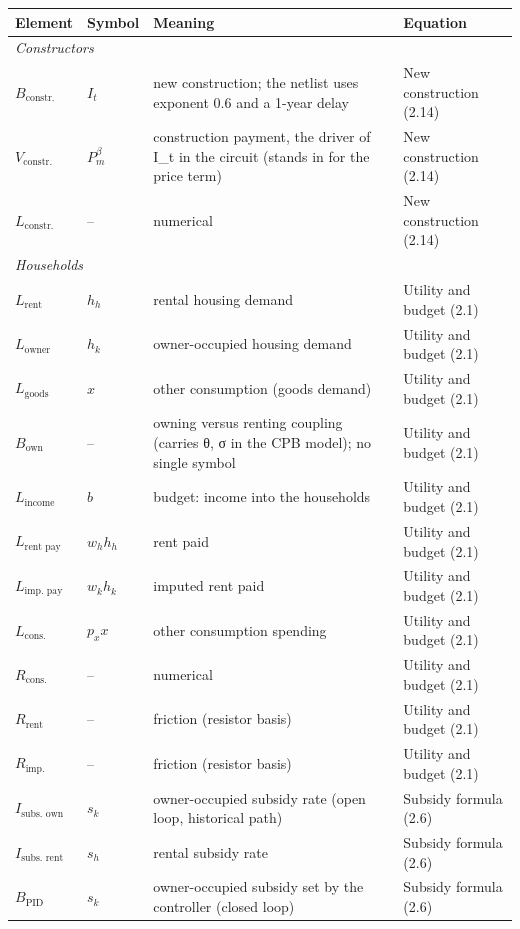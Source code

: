 \begin{tabular}{llll}
\toprule
Element & Symbol & Meaning & Equation\\
\midrule
\multicolumn{4}{l}{\textit{Constructors}}\\
$B_{\text{constr.}}$ & $I_t$ & new construction; the netlist uses exponent 0.6 and a 1-year delay & New construction (2.14)\\
$V_{\text{constr.}}$ & $P_m^{\beta}$ & construction payment, the driver of I\_t in the circuit (stands in for the price term) & New construction (2.14)\\
$L_{\text{constr.}}$ & -- & numerical & New construction (2.14)\\
\midrule
\multicolumn{4}{l}{\textit{Households}}\\
$L_{\text{rent}}$ & $h_h$ & rental housing demand & Utility and budget (2.1)\\
$L_{\text{owner}}$ & $h_k$ & owner-occupied housing demand & Utility and budget (2.1)\\
$L_{\text{goods}}$ & $x$ & other consumption (goods demand) & Utility and budget (2.1)\\
$B_{\text{own}}$ & -- & owning versus renting coupling (carries θ, σ in the CPB model); no single symbol & Utility and budget (2.1)\\
$L_{\text{income}}$ & $b$ & budget: income into the households & Utility and budget (2.1)\\
$L_{\text{rent pay}}$ & $w_h h_h$ & rent paid & Utility and budget (2.1)\\
$L_{\text{imp. pay}}$ & $w_k h_k$ & imputed rent paid & Utility and budget (2.1)\\
$L_{\text{cons.}}$ & $p_x x$ & other consumption spending & Utility and budget (2.1)\\
$R_{\text{cons.}}$ & -- & numerical & Utility and budget (2.1)\\
$R_{\text{rent}}$ & -- & friction (resistor basis) & Utility and budget (2.1)\\
$R_{\text{imp.}}$ & -- & friction (resistor basis) & Utility and budget (2.1)\\
$I_{\text{subs. own}}$ & $s_k$ & owner-occupied subsidy rate (open loop, historical path) & Subsidy formula (2.6)\\
$I_{\text{subs. rent}}$ & $s_h$ & rental subsidy rate & Subsidy formula (2.6)\\
$B_{\text{PID}}$ & $s_k$ & owner-occupied subsidy set by the controller (closed loop) & Subsidy formula (2.6)\\

\end{tabular}
